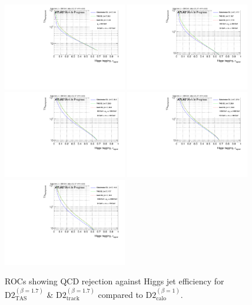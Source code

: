 \begin{figure}[H]
\includegraphics[width=0.48\textwidth]{sascha_input/Appendix/Higgs_best/ROC_ALL_h_recoJet_D2_17_bin1.pdf} \hspace{1mm}
\includegraphics[width=0.48\textwidth]{sascha_input/Appendix/Higgs_best/ROC_ALL_h_recoJet_D2_17_bin2.pdf}
\bigskip
\includegraphics[width=0.48\textwidth]{sascha_input/Appendix/Higgs_best/ROC_ALL_h_recoJet_D2_17_bin3.pdf} \hspace{1mm}
\includegraphics[width=0.48\textwidth]{sascha_input/Appendix/Higgs_best/ROC_ALL_h_recoJet_D2_17_bin4.pdf}
\bigskip
\includegraphics[width=0.48\textwidth]{sascha_input/Appendix/Higgs_best/ROC_ALL_h_recoJet_D2_17_bin5.pdf} 
\caption{{ROCs showing QCD rejection against Higgs jet efficiency for $\text{D2}_{\text{TAS}}^{(\beta=1.7)}$ \& $\text{D2}_{\text{track}}^{(\beta=1.7)}$ compared to $\text{D2}_{\text{calo}}^{(\beta=1)}$.}}
\end{figure}\label{fig:ROC_best_higgs}

